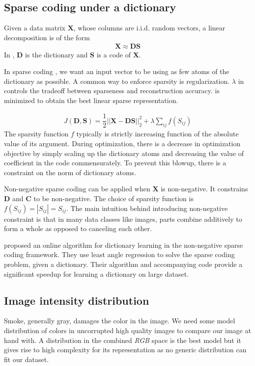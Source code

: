 \subsection{Sparse coding under a dictionary}

Given a data matrix $\mathbf{X}$, whose columns are i.i.d. random vectors, a linear decomposition is of the form 
\begin{align}
    \mathbf{X} \approx \mathbf{D} \mathbf{S} \label{eqn:lineardecomp}
\end{align}
In , $\mathbf{D}$ is the dictionary and $\mathbf{S}$ is a code of $\mathbf{X}$.

In sparse coding \cite{harpur1996sc}, we want an input vector to be using as few atoms of the dictionary as possible. A common way to enforce sparsity is regularization. $\lambda$ in  controls the tradeoff between sparseness and reconstruction accuracy.  is minimized to obtain the best linear sparse representation.

\begin{align}
    J(\mathbf{D}, \mathbf{S}) = \dfrac{1}{2} || \mathbf{X} - \mathbf{D} \mathbf{S} ||_2^2 + \lambda \sum_{ij} f(S_{ij}) \label{eqn:sparsecoding}
\end{align}
The sparsity function $f$ typically is strictly increasing function of the absolute value of its argument. During optimization, there is a decrease in optimization objective by simply scaling up the dictionary atoms and decreasing the value of coefficient in the code commensurately. To prevent this blowup, there is a constraint on the norm of dictionary atoms.


Non-negative sparse coding \cite{hoyer2002nnsc} can be applied when $\mathbf{X}$ is non-negative. It constrains $\mathbf{D}$ and $\mathbf{C}$ to be non-negative. The choice of sparsity function is $f(S_{ij}) = | S_{ij} | = S_{ij}$. The main intuition behind introducing non-negative constraint is that in many data classes like images, parts combine additively to form a whole as opposed to canceling each other.

\cite{mairal2009online} proposed an online algorithm for dictionary learning in the non-negative sparse coding framework. They use least angle regression to solve the sparse coding problem, given a dictionary. Their algorithm and accompanying code provide a significant speedup for learning a  dictionary on large dataset.


\subsection{Image intensity distribution}
Smoke, generally gray, damages the color in the image. We need some model distribution of colors in uncorrupted high quality images to compare our image at hand with. A distribution in the combined \textit{RGB} space is the best model but it gives rise to high complexity for its representation as no generic distribution can fit our dataset.


